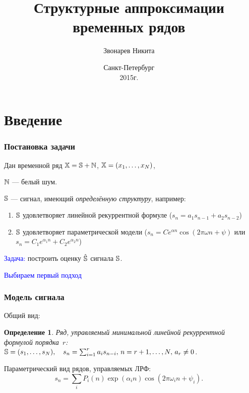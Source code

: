 \documentclass[unicode, notheorems]{beamer}
\title[Структурные аппроксимации временных рядов]{Структурные аппроксимации временных рядов}
\author[Звонарев Никита]{Звонарев Никита}
\institute[СПбГУ]{Санкт-Петербургский государственный университет \\
    Кафедра статистического моделирования
}
\date{
    Санкт-Петербург\\
    2015г.
}
\newtheorem{definition}{Определение}
\begin{document}
\begin{frame}
    \titlepage
\end{frame}


\section{Введение}
\begin{frame}
	\frametitle{Постановка задачи}
	Дан временной ряд $\mathbb{X} = \mathbb{S} + \mathbb{N}$, $\mathbb{X} = (x_1, \ldots, x_N)$, 
	
	$\mathbb{N}$ --- белый шум.

	$\mathbb{S}$ --- сигнал, имеющий \textit{определённую структуру}, например:
	\begin{enumerate}
		\item $\mathbb{S}$ удовлетворяет линейной рекуррентной формуле ($s_n = a_1 s_{n-1} + a_2 s_{n-2}$)
		\item $\mathbb{S}$ удовлетворяет параметрической модели ($s_n = C e^{\alpha n} \cos(2 \pi \omega n + \psi)$ или $s_n = C_1 e^{\alpha_1 n} + C_2 e^{\alpha_2 n}$)
	\end{enumerate}
	
	\textcolor{blue}{Задача:} построить оценку $\hat {\mathbb{S}}$ сигнала $\mathbb{S}$.
	
	\pause
	
	\textcolor{blue}{Выбираем первый подход}
\end{frame}

\begin{frame}
	\frametitle{Модель сигнала}
	Общий вид:
	
	\begin{definition}
		Ряд, управляемый минимальной линейной рекуррентной формулой порядка~$r$: $\mathbb{S} = (s_1, \ldots, s_N), \quad s_n = \sum_{i = 1}^{r} a_i s_{n-i}, \, n = r + 1, \ldots, N, \, a_r \ne 0$.
	\end{definition}
	
	\vspace{0.5cm}
	Параметрический вид рядов, управляемых ЛРФ:
	\begin{equation*}
	s_n = \sum_i P_i(n) \exp(\alpha_i n) \cos(2 \pi \omega_i n + \psi_i).
	\end{equation*}
	
\end{frame}
\end{document}
